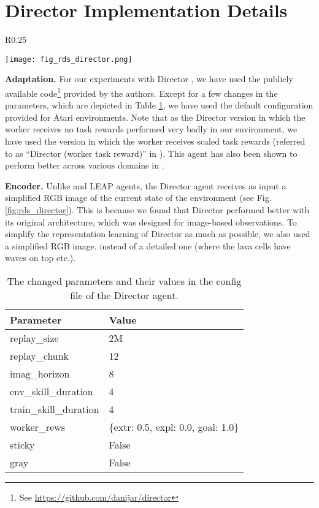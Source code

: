 \section{Director Implementation Details}
\label{sec:director_exp_details}

\begin{wrapfigure}{R}{0.25\textwidth}
  \begin{center}
    \texttt{[image: fig\_rds\_director.png]}
  \end{center}
  \caption{\small \textbf{An example for simplified observations for Director.}}
  \label{fig:rds_director}
\end{wrapfigure}

\textbf{Adaptation.} For our experiments with Director \citep{hafner2022deep}, we have used the publicly available code\footnote{See \url{https://github.com/danijar/director}} provided by the authors. Except for a few changes in the parameters, which are depicted in Table \ref{tab:director_configs}, we have used the default configuration provided for Atari environments. Note that as the Director version in which the worker receives no task rewards performed very badly in our environment, we have used the version in which the worker receives scaled task rewards (referred to as ``Director (worker task reward)'' in \citet{hafner2022deep}). This agent has also been shown to perform better across various domains in \citet{hafner2022deep}.

\textbf{Encoder.} Unlike \agentshort{} and LEAP agents, the Director agent receives as input a simplified RGB image of the current state of the environment (see Fig. \ref{fig:rds_director}). This is because we found that Director performed better with its original architecture, which was designed for image-based observations. To simplify the representation learning of Director as much as possible, we also used a simplified RGB image, instead of a detailed one (where the lava cells have waves on top etc.).

\begin{table}[]
    \centering
    \caption{\small The changed parameters and their values in the config file of the Director agent.}
    
    \begin{tabular}{|p{3cm}|p{5cm}|}
    \hline
    Parameter & Value \\
    \hline
    replay\_size & 2M \\
    replay\_chunk & 12 \\
    imag\_horizon & 8 \\
    env\_skill\_duration & 4 \\
    train\_skill\_duration & 4 \\
    worker\_rews & \{extr: 0.5, expl: 0.0, goal: 1.0\} \\
    sticky & False \\ 
    gray & False \\
    \hline
    \end{tabular}
    \label{tab:director_configs}
\end{table}


